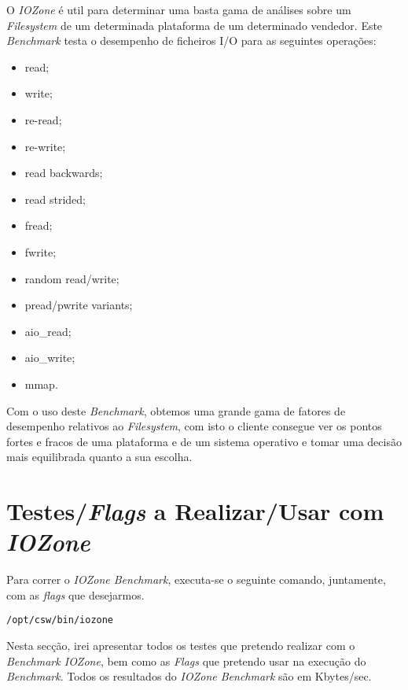 \documentclass[conference,compsoc]{IEEEtran}
\begin{document}
O \textit{IOZone} é util para determinar uma basta gama de análises sobre um \textit{Filesystem} de um determinada plataforma de um determinado vendedor. Este \textit{Benchmark} testa o desempenho de ficheiros I/O para as seguintes operações:

\begin{itemize}
	\item read;
	\item write;
	\item re-read;
	\item re-write;
	\item read backwards;
	\item read strided;
	\item fread; 
	\item fwrite;
	\item random read/write;
	\item pread/pwrite variants;
	\item aio\_read;
	\item aio\_write;
	\item mmap.
\end{itemize}

Com o uso deste \textit{Benchmark}, obtemos uma grande gama de fatores de desempenho relativos ao \textit{Filesystem}, com isto o cliente consegue ver os pontos fortes e fracos de uma plataforma e de um sistema operativo e tomar uma decisão mais equilibrada quanto a sua escolha.  

\section{Testes/\textit{Flags} a Realizar/Usar com \textit{IOZone}}

Para correr o \textit{IOZone Benchmark}, executa-se o seguinte comando, juntamente, com as \textit{flags} que desejarmos.

\begin{lstlisting}
/opt/csw/bin/iozone
\end{lstlisting}

Nesta secção, irei apresentar todos os testes que pretendo realizar com o \textit{Benchmark IOZone}, bem como as \textit{Flags} que pretendo usar na execução do \textit{Benchmark}. Todos os resultados do \textit{IOZone Benchmark} são em Kbytes/sec.
\end{document}
